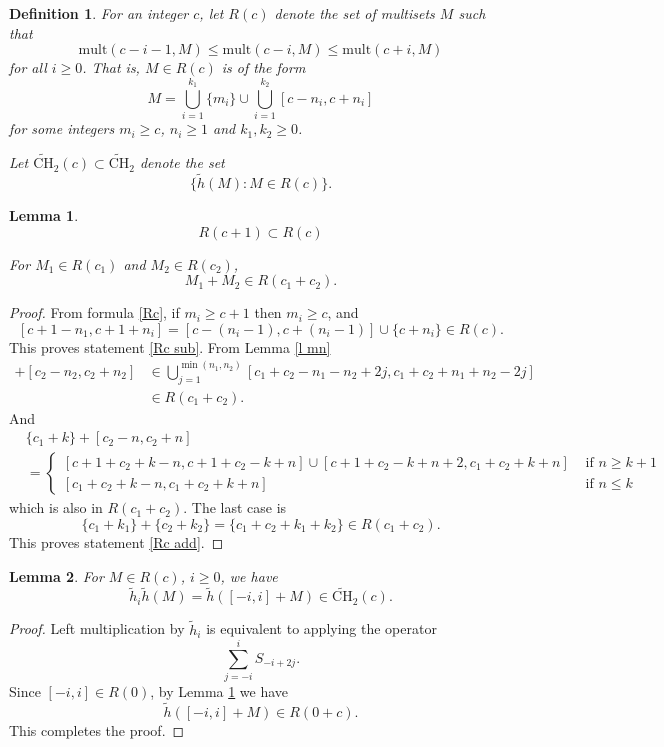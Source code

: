 \documentclass[11pt, oneside]{article}   	%
\newtheorem{lemma}{Lemma}
\newtheorem{definition}{Definition}
\newcommand{\ti}{\tilde{h}}
\newcommand{\mult}{\mathrm{mult}}
\newcommand{\tCH}{\tilde{\mathrm{CH}}_2}
\begin{document}
\begin{definition} \label{d Rc}
For an integer $c$, let $R(c)$ denote the set of multisets $M$ such that 
\[
 \mult(c-i-1,M)  \leq  \mult(c-i,M) \leq \mult(c+i,M)
\]
for all $i \geq 0$. That is, $M \in R(c)$ is of the form 
\begin{equation} \label{Rc}
M = \bigcup_{i=1}^{k_1} \{ m_i\} \cup\bigcup_{i=1}^{k_2} [c-n_i, c+n_i]
\end{equation}
for some integers $m_i \geq c$, $n_i \geq 1$ and $k_1, k_2 \geq 0$. 

Let $\tCH(c) \subset \tCH$  denote the set
\[
\{ \ti(M) \colon M \in R(c) \}.
\]
\end{definition} 

\begin{lemma} \label{l Rc add}
\begin{equation} \label{Rc sub}
R(c+1) \subset R(c)
\end{equation}

For $M_1 \in R(c_1)$ and $M_2 \in R(c_2)$, 
\begin{equation} \label{Rc add}
M_1+M_2 \in R(c_1+c_2).
\end{equation}
\end{lemma}
\begin{proof} 
From formula \eqref{Rc}, if $m_i \geq c+1$ then $m_i \geq c$, and 
\[
[c+1-n_1,c+1+n_i]  = [c-(n_i-1), c+(n_i-1)] \cup \{ c+n_i\} \in R(c).
\]
This proves statement \eqref{Rc sub}. 
From Lemma \ref{l mn}
\begin{align*}
[c_1-n_1, c_1+n_1] + [c_2-n_2,c_2+n_2] &\in \bigcup_{j=1}^{\min(n_1,n_2)} [c_1+c_2 - n_1-n_2+2j, c_1+c_2+n_1+n_2 - 2j] \\ 
 &\in R(c_1+c_2).
\end{align*}
And 
\begin{align*}
&\{c_1+k\} + [c_2-n, c_2+n] \\ 
&= \begin{cases}[c+1+c_2+k-n, c+1+c_2-k+n] \cup [ c+1+c_2-k+n+2,c_1+c_2+k+n] &\text{ if } n \geq k+1 \\  
[ c_1+c_2+k-n,c_1+c_2+k+n] &\text{ if } n \leq k
\end{cases}
\end{align*}
which is also in $R(c_1+c_2)$. The last case is 
\[
\{c_1+k_1\} + \{ c_2+k_2\} =  \{c_1 +c_2+k_1+k_2\}  \in R(c_1+c_2). 
\]
This proves statement \eqref{Rc add}.
\end{proof}

\begin{lemma} \label{l left Rc}
For $M \in R(c)$, $i \geq 0$, we have
\[
\ti_i \ti(M) = \ti([-i,i]+M) \in \tCH(c). 
\]
\end{lemma}
\begin{proof}
Left multiplication by $\ti_i$ is equivalent to applying the operator 
\[
\sum_{j=-i}^i S_{-i+2j}.
\] 
Since $[-i,i]\in R(0)$, by Lemma \ref{l Rc add} we have 
\[
\ti([-i,i]+M) \in R(0+c). 
\]
This completes the proof. 
\end{proof}
\end{document}
